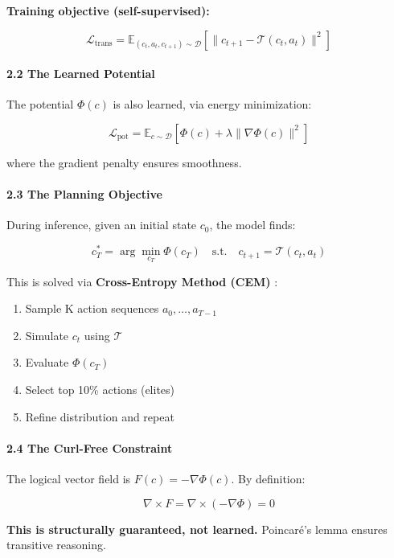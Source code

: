 \documentclass[
  11pt,
  a4paper,
]{article}
\providecommand{\tightlist}{%
  \setlength{\itemsep}{0pt}\setlength{\parskip}{0pt}}
\begin{document}
\textbf{Training objective (self-supervised):}

\[\mathcal{L}_{\text{trans}} = \mathbb{E}_{(c_t, a_t, c_{t+1}) \sim \mathcal{D}} \left[ \|c_{t+1} - \mathcal{T}(c_t, a_t)\|^2 \right]\]

\paragraph{2.2 The Learned Potential}\label{the-learned-potential}

The potential \(\Phi(c)\) is also learned, via energy minimization:

\[\mathcal{L}_{\text{pot}} = \mathbb{E}_{c \sim \mathcal{D}} \left[ \Phi(c) + \lambda \|\nabla \Phi(c)\|^2 \right]\]

where the gradient penalty ensures smoothness.

\paragraph{2.3 The Planning Objective}\label{the-planning-objective}

During inference, given an initial state \(c_0\), the model finds:

\[c_T^* = \arg\min_{c_T} \Phi(c_T) \quad \text{s.t.} \quad c_{t+1} = \mathcal{T}(c_t, a_t)\]

This is solved via \textbf{Cross-Entropy Method (CEM)} :

\begin{enumerate}
\def\labelenumi{\arabic{enumi}.}
\tightlist
\item
  Sample K action sequences \(a_0, \dots, a_{T-1}\)
\item
  Simulate \(c_t\) using \(\mathcal{T}\)
\item
  Evaluate \(\Phi(c_T)\)
\item
  Select top 10\% actions (elites)
\item
  Refine distribution and repeat
\end{enumerate}

\paragraph{2.4 The Curl-Free Constraint}\label{the-curl-free-constraint}

The logical vector field is \(F(c) = -\nabla \Phi(c)\). By definition:

\[\nabla \times F = \nabla \times (-\nabla \Phi) = 0\]

\textbf{This is structurally guaranteed, not learned.} Poincaré's lemma
ensures transitive reasoning.
\end{document}
